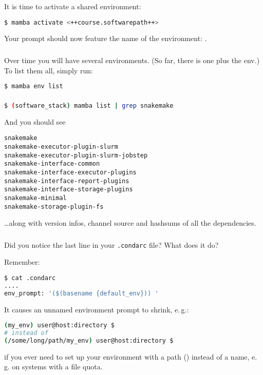 \begin{frame}[fragile]
	\frametitle{}
	It is time to activate a shared environment:
	\begin{lstlisting}[language=Bash, style=Shell]
$ mamba activate <++course.softwarepath++>
	\end{lstlisting}
	Your prompt should now feature the name of the environment: .
\end{frame}

\begin{frame}[fragile]
	\frametitle{}
	Over time you will have several environments. (So far, there is one plus the  env.) To list them all, simply run:
	\begin{lstlisting}[language=Bash, style=Shell]
$ mamba env list
	\end{lstlisting}
\end{frame}

\begin{frame}[fragile]
    \frametitle{}
    \begin{lstlisting}[language=Bash, style=Shell]
$ (software_stack) mamba list | grep snakemake
    \end{lstlisting}
     And you should see
     \begin{lstlisting}[style=Plain]
snakemake
snakemake-executor-plugin-slurm
snakemake-executor-plugin-slurm-jobstep
snakemake-interface-common
snakemake-interface-executor-plugins
snakemake-interface-report-plugins
snakemake-interface-storage-plugins
snakemake-minimal
snakemake-storage-plugin-fs
     \end{lstlisting}
     \ldots along with version infos, channel source and hashsums of all the dependencies.
\end{frame}

\begin{frame}[fragile]
   \frametitle{}
   \begin{question}
   	Did you notice the last line in your \texttt{.condarc} file? What does it do?
   \end{question} 
   Remember:
     \begin{lstlisting}[language=Bash, style=Shell]
$ cat .condarc
....
env_prompt: '($(basename {default_env})) '
   \end{lstlisting}
   \pause
   It causes an unnamed environment prompt to shrink, e.\,g.:
   \begin{lstlisting}[language=Bash, style=Plain]
(my_env) user@host:directory $
# instead of
(/some/long/path/my_env) user@host:directory $
   \end{lstlisting}
   if you ever need to set up your environment with a path () instead of a name, e.\,g. on systems with a file quota.
\end{frame}



